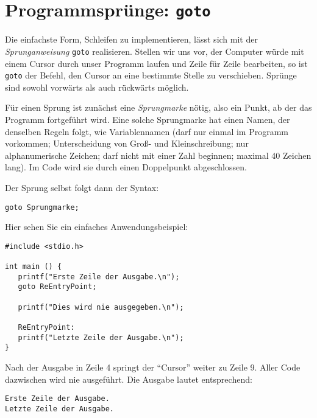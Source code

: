 \section{Programmsprünge: \texttt{goto}}
Die einfachste Form, Schleifen zu implementieren, lässt sich mit der \emph{Sprunganweisung} \texttt{goto} realisieren. Stellen wir uns vor, der Computer würde mit einem Cursor durch unser Programm laufen und Zeile für Zeile bearbeiten, so ist \texttt{goto} der Befehl, den Cursor an eine bestimmte Stelle zu verschieben. Sprünge sind sowohl vorwärts als auch rückwärts möglich.

Für einen Sprung ist zunächst eine \emph{Sprungmarke} nötig, also ein Punkt, ab der das Programm fortgeführt wird. Eine solche Sprungmarke hat einen Namen, der denselben Regeln folgt, wie Variablennamen (darf nur einmal im Programm vorkommen; Unterscheidung von Groß- und Kleinschreibung; nur alphanumerische Zeichen; darf nicht mit einer Zahl beginnen; maximal 40 Zeichen lang). Im Code wird sie durch einen Doppelpunkt abgeschlossen.

Der Sprung selbst folgt dann der Syntax:
\begin{codebox}
\begin{verbatim}
goto Sprungmarke;
\end{verbatim}
\end{codebox}

Hier sehen Sie ein einfaches Anwendungsbeispiel:
\begin{codebox}
\begin{verbatim}
#include <stdio.h>

int main () {
   printf("Erste Zeile der Ausgabe.\n");
   goto ReEntryPoint;

   printf("Dies wird nie ausgegeben.\n");

   ReEntryPoint:
   printf("Letzte Zeile der Ausgabe.\n");
}
\end{verbatim}
\end{codebox}

Nach der Ausgabe in Zeile 4 springt der \enquote{Cursor} weiter zu Zeile 9. Aller Code dazwischen wird nie ausgeführt. Die Ausgabe lautet entsprechend:

\begin{cmdbox}
\begin{verbatim}
Erste Zeile der Ausgabe.
Letzte Zeile der Ausgabe.
\end{verbatim}
\end{cmdbox}

